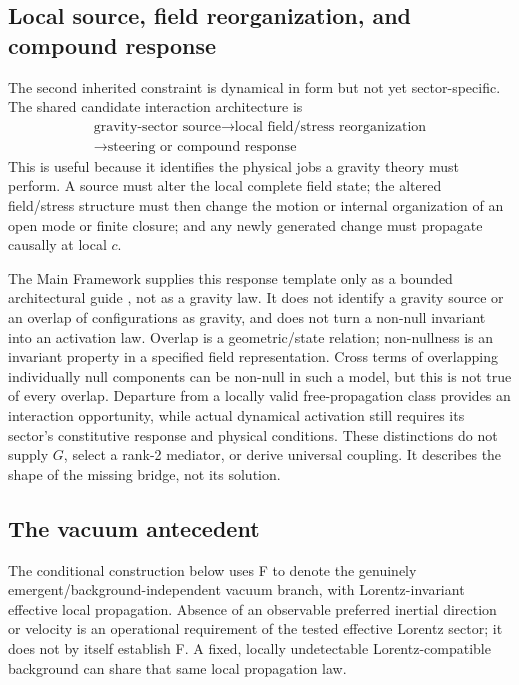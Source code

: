 \documentclass[11pt]{article}
\theoremstyle{plain}
\theoremstyle{remark}
\begin{document}
\subsection{Local source, field reorganization, and compound response}

The second inherited constraint is dynamical in form but not yet sector-specific.  The
shared candidate interaction architecture is
\begin{equation}
\boxed{
\begin{gathered}
\text{gravity-sector source}
\longrightarrow\text{local field/stress reorganization}\\
\longrightarrow\text{steering or compound response}
\end{gathered}}
\label{eq:response-template}
\end{equation}
This is useful because it identifies the physical jobs a gravity theory must perform.  A
source must alter the local complete field state; the altered field/stress structure must
then change the motion or internal organization of an open mode or finite closure; and
any newly generated change must propagate causally at local $c$.

The Main Framework supplies this response template only as a bounded
architectural guide \cite{CmotionMainFramework2026}, not as a gravity law.
It does not identify a gravity source or an overlap of configurations as gravity,
and does not turn a non-null invariant into an activation law.  Overlap is a
geometric/state relation; non-nullness is an invariant property in a specified
field representation.  Cross terms of overlapping individually null components
can be non-null in such a model, but this is not true of every overlap.
Departure from a locally valid free-propagation class provides an interaction
opportunity, while actual dynamical activation still requires its sector's
constitutive response and physical conditions.  These distinctions do not
supply $G$, select a rank-2 mediator, or derive universal coupling.
It describes the shape of the missing bridge, not its solution.

\subsection{The vacuum antecedent}
\label{sec:vacuum}

The conditional construction below uses F to denote the genuinely
emergent/background-independent vacuum branch, with Lorentz-invariant effective
local propagation.  Absence of an observable preferred inertial direction or
velocity is an operational requirement of the tested effective Lorentz sector;
it does not by itself establish F.  A fixed, locally undetectable
Lorentz-compatible background can share that same local propagation law.
\end{document}
